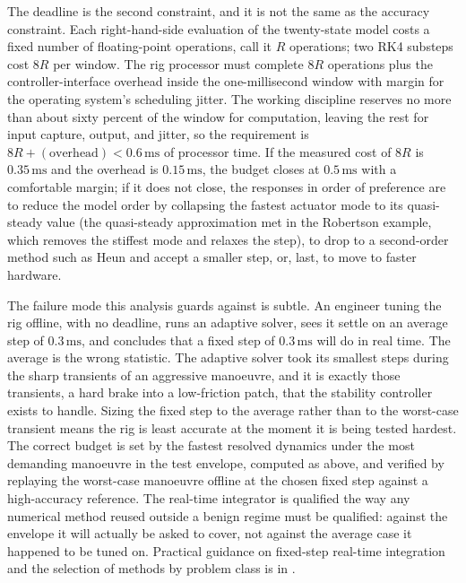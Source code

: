 The deadline is the second constraint, and it is not the same as the
accuracy constraint. Each right-hand-side evaluation of the
twenty-state model costs a fixed number of floating-point operations,
call it $R$ operations; two RK4 substeps cost $8R$ per window. The rig
processor must complete $8R$ operations plus the controller-interface
overhead inside the one-millisecond window with margin for the
operating system's scheduling jitter. The working discipline reserves
no more than about sixty percent of the window for computation, leaving
the rest for input capture, output, and jitter, so the requirement is
$8R + (\text{overhead}) < 0.6\,\si{\milli\second}$ of processor time. If
the measured cost of $8R$ is $0.35\,\si{\milli\second}$ and the overhead
is $0.15\,\si{\milli\second}$, the budget closes at
$0.5\,\si{\milli\second}$ with a comfortable margin; if it does not
close, the responses in order of preference are to reduce the model
order by collapsing the fastest actuator mode to its quasi-steady
value (the quasi-steady approximation met in the Robertson example,
which removes the stiffest mode and relaxes the step), to drop to a
second-order method such as Heun and accept a smaller step, or, last,
to move to faster hardware.

The failure mode this analysis guards against is subtle. An engineer
tuning the rig offline, with no deadline, runs an adaptive solver, sees
it settle on an average step of $0.3\,\si{\milli\second}$, and concludes
that a fixed step of $0.3\,\si{\milli\second}$ will do in real time. The
average is the wrong statistic. The adaptive solver took its smallest
steps during the sharp transients of an aggressive manoeuvre, and it is
exactly those transients, a hard brake into a low-friction patch, that
the stability controller exists to handle. Sizing the fixed step to the
average rather than to the worst-case transient means the rig is least
accurate at the moment it is being tested hardest. The correct budget
is set by the fastest resolved dynamics under the most demanding
manoeuvre in the test envelope, computed as above, and verified by
replaying the worst-case manoeuvre offline at the chosen fixed step
against a high-accuracy reference. The real-time integrator is qualified
the way any numerical method reused outside a benign regime must be
qualified: against the envelope it will actually be asked to cover, not
against the average case it happened to be tuned on. Practical guidance
on fixed-step real-time integration and the selection of methods by
problem class is in
\textcite{text:v2ch07-shampine-gladwell-thompson}.

